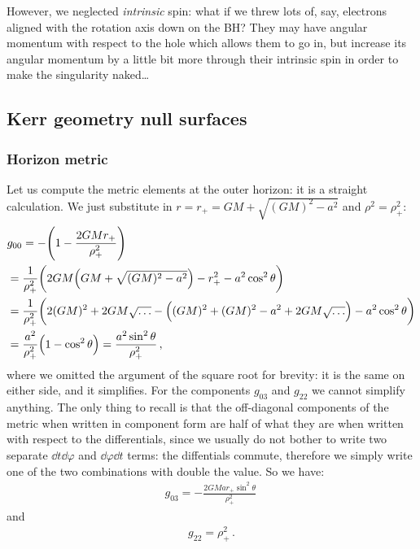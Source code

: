 \documentclass[main.tex]{subfiles}
\begin{document}
However, we neglected \emph{intrinsic} spin: what if we threw lots of, say, electrons aligned with the rotation axis down on the BH? 
They may have angular momentum with respect to the hole which allows them to go in, but increase its angular momentum by a little bit more through their intrinsic spin in order to make the singularity naked\dots

\subsection{Kerr geometry null surfaces}

\subsubsection{Horizon metric}

Let us compute the metric elements at the outer horizon: it is a straight calculation. We just substitute in \(r = r_{+} = GM + \sqrt{(GM)^2 - a^2}\) and \(\rho^2 = \rho^2_{+}\): 
%
\begin{subequations}
\begin{align}
  &g_{00}  = - \qty(1 - \frac{2GMr_{+}}{\rho_{+}^2})  \\
  &= \frac{1}{\rho_{+}^2} \qty(2GM \qty(GM + \sqrt{(GM)^2 - a^2}) - r_{+}^2 - a^2 \cos^2\theta )  \\
  &= \frac{1}{\rho_{+}^2} \qty( 2 (GM)^2 + 2GM \sqrt{\dots}- \qty((GM)^2 + (GM)^2 -a^2 + 2GM \sqrt{\dots}) - a^2 \cos^2 \theta )  \\
  &= \frac{a^2}{\rho_{+}^2}  \qty(1 - \cos^2 \theta ) = \frac{a^2 \sin^2\theta}{\rho_{+}^2}
\,,
\end{align}
\end{subequations}
%
where we omitted the argument of the square root for brevity: it is the same on either side, and it simplifies. 
For the components \(g_{03}\) and \(g_{22} \) we cannot simplify anything. The  only thing to recall is that the off-diagonal components of the metric when written in component form are half of what they are when written with respect to the differentials, since we usually do not bother to write two separate \(\dd{t} \dd{\varphi }\) and \(\dd{\varphi } \dd{t}\) terms: the diffentials commute, therefore we simply write one of the two combinations with double the value. So we have: 
%
\begin{align}
  g_{03} = -\frac{2GMa r_+ \sin^2\theta }{\rho_{+}^2}
\,
\end{align}
and 
%
\begin{align}
  g_{22} = \rho_{+}^2
\,.
\end{align}
\end{document}
